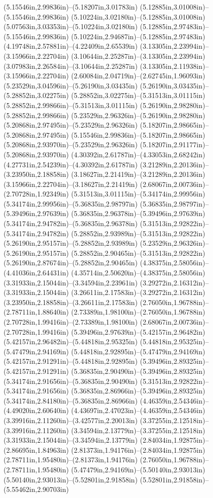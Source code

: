 (5.15546in,2.99836in)--(5.18207in,3.01783in) (5.12885in,3.01008in)--(5.15546in,2.99836in) (5.10224in,3.02180in)--(5.12885in,3.01008in) (5.07563in,3.03353in)--(5.10224in,3.02180in) (5.12885in,2.97483in)--(5.15546in,2.99836in) (5.10224in,2.94687in)--(5.12885in,2.97483in) (4.19748in,2.57881in)--(4.22409in,2.65539in) (3.13305in,2.23994in)--(3.15966in,2.22704in) (3.10644in,2.25287in)--(3.13305in,2.23994in) (3.07983in,2.26584in)--(3.10644in,2.25287in) (3.13305in,2.11938in)--(3.15966in,2.22704in) (2.60084in,2.04719in)--(2.62745in,1.96093in) (5.23529in,3.04596in)--(5.26190in,3.03435in) (5.26190in,3.03435in)--(5.28852in,3.02275in) (5.28852in,3.02275in)--(5.31513in,3.01115in) (5.28852in,2.99866in)--(5.31513in,3.01115in) (5.26190in,2.98280in)--(5.28852in,2.99866in) (5.23529in,2.96326in)--(5.26190in,2.98280in) (5.20868in,2.97495in)--(5.23529in,2.96326in) (5.18207in,2.98665in)--(5.20868in,2.97495in) (5.15546in,2.99836in)--(5.18207in,2.98665in) (5.20868in,2.93970in)--(5.23529in,2.96326in) (5.18207in,2.91177in)--(5.20868in,2.93970in) (4.30392in,2.61787in)--(4.33053in,2.68242in) (4.27731in,2.54239in)--(4.30392in,2.61787in) (3.21289in,2.20136in)--(3.23950in,2.18858in) (3.18627in,2.21419in)--(3.21289in,2.20136in) (3.15966in,2.22704in)--(3.18627in,2.21419in) (2.68067in,2.00736in)--(2.70728in,1.92349in) (5.31513in,3.01115in)--(5.34174in,2.99956in) (5.34174in,2.99956in)--(5.36835in,2.98797in) (5.36835in,2.98797in)--(5.39496in,2.97639in) (5.36835in,2.96378in)--(5.39496in,2.97639in) (5.34174in,2.94782in)--(5.36835in,2.96378in) (5.31513in,2.92822in)--(5.34174in,2.94782in) (5.28852in,2.93989in)--(5.31513in,2.92822in) (5.26190in,2.95157in)--(5.28852in,2.93989in) (5.23529in,2.96326in)--(5.26190in,2.95157in) (5.28852in,2.90465in)--(5.31513in,2.92822in) (5.26190in,2.87674in)--(5.28852in,2.90465in) (4.38375in,2.58056in)--(4.41036in,2.64431in) (4.35714in,2.50620in)--(4.38375in,2.58056in) (3.31933in,2.15044in)--(3.34594in,2.23961in) (3.29272in,2.16312in)--(3.31933in,2.15044in) (3.26611in,2.17583in)--(3.29272in,2.16312in) (3.23950in,2.18858in)--(3.26611in,2.17583in) (2.76050in,1.96788in)--(2.78711in,1.88640in) (2.73389in,1.98100in)--(2.76050in,1.96788in) (2.70728in,1.99416in)--(2.73389in,1.98100in) (2.68067in,2.00736in)--(2.70728in,1.99416in) (5.39496in,2.97639in)--(5.42157in,2.96482in) (5.42157in,2.96482in)--(5.44818in,2.95325in) (5.44818in,2.95325in)--(5.47479in,2.94169in) (5.44818in,2.92895in)--(5.47479in,2.94169in) (5.42157in,2.91291in)--(5.44818in,2.92895in) (5.39496in,2.89325in)--(5.42157in,2.91291in) (5.36835in,2.90490in)--(5.39496in,2.89325in) (5.34174in,2.91656in)--(5.36835in,2.90490in) (5.31513in,2.92822in)--(5.34174in,2.91656in) (5.36835in,2.86966in)--(5.39496in,2.89325in) (5.34174in,2.84180in)--(5.36835in,2.86966in) (4.46359in,2.54346in)--(4.49020in,2.60640in) (4.43697in,2.47023in)--(4.46359in,2.54346in) (3.39916in,2.11260in)--(3.42577in,2.20013in) (3.37255in,2.12518in)--(3.39916in,2.11260in) (3.34594in,2.13779in)--(3.37255in,2.12518in) (3.31933in,2.15044in)--(3.34594in,2.13779in) (2.84034in,1.92875in)--(2.86695in,1.84963in) (2.81373in,1.94176in)--(2.84034in,1.92875in) (2.78711in,1.95480in)--(2.81373in,1.94176in) (2.76050in,1.96788in)--(2.78711in,1.95480in) (5.47479in,2.94169in)--(5.50140in,2.93013in) (5.50140in,2.93013in)--(5.52801in,2.91858in) (5.52801in,2.91858in)--(5.55462in,2.90703in) 